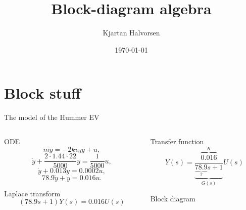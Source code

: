 \documentclass[presentation,aspectratio=169, usenames, dvipsnames]{beamer}
\author{Kjartan Halvorsen}
\date{\today}
\title{Block-diagram algebra}
\begin{document}
\maketitle


\section{Block stuff}
\label{sec:org06f72d5}

\begin{frame}[label={sec:org0f0cb78}]{The model of the Hummer EV}
\begin{columns}
\begin{column}{0.5\columnwidth}
\begin{block}{ODE}
\[m\dot{y} = -2kv_0y + u,\]
\[ \dot{y} + \frac{2\cdot 1.44\cdot 22}{5000} y = \frac{1}{5000} u, \]
\[ \dot{y} + 0.013 y = 0.0002u, \]
\[ 78.9\dot{y} + y = 0.016u. \]
\end{block}

\begin{block}{Laplace transform}
\[ (78.9s + 1) Y(s) = 0.016 U(s) \]
\end{block}
\end{column}

\begin{column}{0.5\columnwidth}
\begin{block}{Transfer function}
\[  Y(s) = \underbrace{\frac{\overbrace{0.016}^K}{ \underbrace{78.9}_\tau s + 1}}_{G(s)} U(s) \]
\end{block}

\begin{block}{Block diagram}
\end{block}
\end{column}
\end{columns}
\end{frame}
\end{document}
